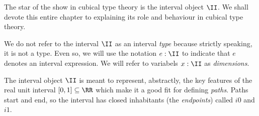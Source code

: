\begin{node}
%
The star of the show in cubical type theory is the interval object
\(\II\). We shall devote this entire chapter to explaining its role and
behaviour in cubical type theory.
%
\end{node}

\begin{node}\label{node:interval-not-type}
We do not refer to the interval \(\II\) as an interval \emph{type}
because strictly speaking, it is not a type. Even so, we will use the
notation \(e : \II\) to indicate that \(e\) denotes an interval
expression. We will refer to variabels \(x : \II\) as \emph{dimensions}.
\end{node}

\begin{node}
%
The interval object \(\II\) is meant to represent, abstractly, the key
features of the real unit interval \([0,1] \subseteq \RR\) which make it
a good fit for defining \emph{paths}. Paths start and end, so the
interval has closed inhabitants (the \emph{endpoints}) called \(i0\) and
\(i1\).
%
\end{node}
